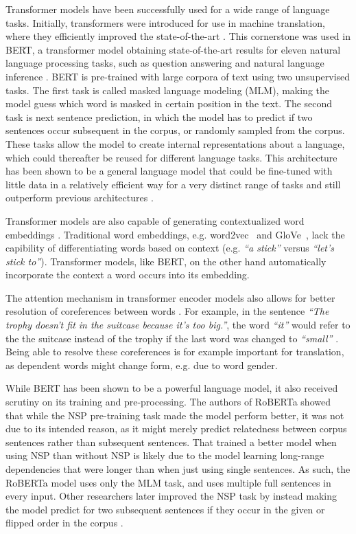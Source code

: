 \documentclass[11pt,a4paper]{article}
\begin{document}
Transformer models have been successfully used for a wide range of language tasks.
Initially, transformers were introduced for use in machine translation, where they efficiently improved the state-of-the-art \citep{vaswaniAttention2017}.
This cornerstone was used in BERT, a transformer model obtaining state-of-the-art results for eleven natural language processing tasks, such as question answering and natural language inference \citep{devlinBERT2019a}.
BERT is pre-trained with large corpora of text using two unsupervised tasks.
The first task is called masked language modeling (MLM),
making the model guess which word is masked in certain position in the text.
The second task is next sentence prediction, in which the model has to predict if two sentences occur subsequent in the corpus, or randomly sampled from the corpus.
These tasks allow the model to create internal representations about a language, which could thereafter be reused for different language tasks.
This architecture has been shown to be a general language model that could be fine-tuned with little data in a relatively efficient way for a very distinct range of tasks and still outperform previous architectures \citep{devlinBERT2019a}.

Transformer models are also capable of generating contextualized word embeddings \citep{peters2018elmo}.
Traditional word embeddings, e.g. word2vec~\citep{mikolovEfficient2013} and GloVe~\citep{penningtonGlove2014}, lack the capibility of differentiating words based on context (e.g. \emph{``a stick''} versus \emph{``let's stick to''}).
Transformer models, like BERT, on the other hand automatically incorporate the context a word occurs into its embedding.

The attention mechanism in transformer encoder models also allows for better resolution of coreferences between words \citep{joshi2019spanbert}.
For example, in the sentence
\emph{``The trophy doesn’t fit in the suitcase because it’s
too big.''}, the word \emph{``it''} would refer to the the suitcase instead of the trophy if the last word was changed to \emph{``small''} \citep{levesque2012winograd}.
Being able to resolve these coreferences is for example important for translation, as dependent words might change form, e.g. due to word gender.

While BERT has been shown to be a powerful language model, it also received scrutiny on its training and pre-processing.
The authors of RoBERTa \citep{liuRoBERTa2019} showed that while the NSP pre-training task made the model perform better, it was not due to its intended reason, as it might merely predict relatedness between corpus sentences rather than subsequent sentences.
That \citet{devlinBERT2019a} trained a better model when using NSP than without NSP is likely due to the model learning long-range dependencies that were longer than when just using single sentences.
As such, the RoBERTa model uses only the MLM task, and uses multiple full sentences in every input.
Other researchers later improved the NSP task by instead making the model predict for two subsequent sentences if they occur in the given or flipped order in the corpus \citep{lan2019albert}.
\end{document}
